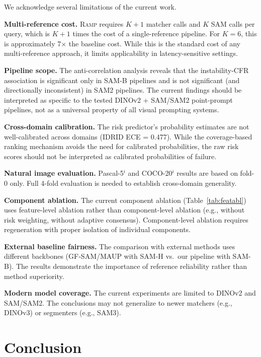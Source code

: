 \documentclass[11pt]{article}
\newcommand{\RAMP}{\textsc{Ramp}}
\begin{document}
We acknowledge several limitations of the current work.

\textbf{Multi-reference cost.} \RAMP{} requires $K+1$ matcher calls and $K$
SAM calls per query, which is $K+1$ times the cost of a single-reference
pipeline. For $K=6$, this is approximately 7$\times$ the baseline cost.
While this is the standard cost of any multi-reference approach, it limits
applicability in latency-sensitive settings.

\textbf{Pipeline scope.} The anti-correlation analysis reveals that the
instability-CFR association is significant only in SAM-B pipelines and is
not significant (and directionally inconsistent) in SAM2 pipelines. The
current findings should be interpreted as specific to the tested DINOv2 +
SAM/SAM2 point-prompt pipelines, not as a universal property of all visual
prompting systems.

\textbf{Cross-domain calibration.} The risk predictor's probability
estimates are not well-calibrated across domains (IDRID ECE = 0.477). While
the coverage-based ranking mechanism avoids the need for calibrated
probabilities, the raw risk scores should not be interpreted as calibrated
probabilities of failure.

\textbf{Natural image evaluation.} Pascal-5$^i$ and COCO-20$^i$ results are
based on fold-0 only. Full 4-fold evaluation is needed to establish
cross-domain generality.

\textbf{Component ablation.} The current component ablation (Table~\ref{tab:featabl})
uses feature-level ablation rather than component-level ablation (e.g.,
without risk weighting, without adaptive consensus). Component-level
ablation requires regeneration with proper isolation of individual
components.

\textbf{External baseline fairness.} The comparison with external methods
uses different backbones (GF-SAM/MAUP with SAM-H vs.\ our pipeline with
SAM-B). The results demonstrate the importance of reference reliability
rather than method superiority.

\textbf{Modern model coverage.} The current experiments are limited to
DINOv2 and SAM/SAM2. The conclusions may not generalize to newer matchers
(e.g., DINOv3) or segmenters (e.g., SAM3).

\section{Conclusion}
\end{document}
